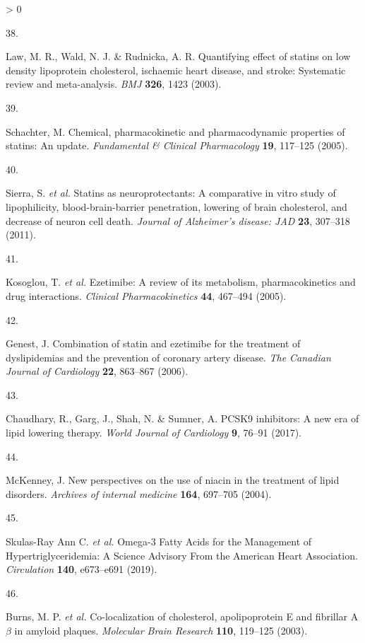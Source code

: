 \documentclass[a4paper, twoside]{templates/ociamthesis}
\newlength{\cslhangindent}
\newlength{\csllabelwidth}
\newenvironment{CSLReferences}[3] %
 {%
  \setlength{\parindent}{0pt}
  \ifodd #1 \everypar{\setlength{\hangindent}{\cslhangindent}}\ignorespaces\fi
  \ifnum #2 > 0
  \setlength{\parskip}{#2\baselineskip}
  \fi
 }%
 {}
\newcommand{\CSLLeftMargin}[1]{\parbox[t]{\maxof{\widthof{#1}}{\csllabelwidth}}{#1}}
\newcommand{\CSLRightInline}[1]{\parbox[t]{\linewidth - \csllabelwidth}{#1}}
\begin{document}
\begin{CSLReferences}{0}{0}
\leavevmode\hypertarget{ref-law2003}{}%
\CSLLeftMargin{38. }
\CSLRightInline{Law, M. R., Wald, N. J. \& Rudnicka, A. R. Quantifying effect of statins on low density lipoprotein cholesterol, ischaemic heart disease, and stroke: Systematic review and meta-analysis. \emph{BMJ} \textbf{326}, 1423 (2003).}

\leavevmode\hypertarget{ref-schachter2005}{}%
\CSLLeftMargin{39. }
\CSLRightInline{Schachter, M. Chemical, pharmacokinetic and pharmacodynamic properties of statins: An update. \emph{Fundamental \& Clinical Pharmacology} \textbf{19}, 117--125 (2005).}

\leavevmode\hypertarget{ref-sierra2011}{}%
\CSLLeftMargin{40. }
\CSLRightInline{Sierra, S. \emph{et al.} Statins as neuroprotectants: A comparative in vitro study of lipophilicity, blood-brain-barrier penetration, lowering of brain cholesterol, and decrease of neuron cell death. \emph{Journal of Alzheimer's disease: JAD} \textbf{23}, 307--318 (2011).}

\leavevmode\hypertarget{ref-kosoglou2005}{}%
\CSLLeftMargin{41. }
\CSLRightInline{Kosoglou, T. \emph{et al.} Ezetimibe: A review of its metabolism, pharmacokinetics and drug interactions. \emph{Clinical Pharmacokinetics} \textbf{44}, 467--494 (2005).}

\leavevmode\hypertarget{ref-genest2006}{}%
\CSLLeftMargin{42. }
\CSLRightInline{Genest, J. Combination of statin and ezetimibe for the treatment of dyslipidemias and the prevention of coronary artery disease. \emph{The Canadian Journal of Cardiology} \textbf{22}, 863--867 (2006).}

\leavevmode\hypertarget{ref-chaudhary2017}{}%
\CSLLeftMargin{43. }
\CSLRightInline{Chaudhary, R., Garg, J., Shah, N. \& Sumner, A. {PCSK9} inhibitors: A new era of lipid lowering therapy. \emph{World Journal of Cardiology} \textbf{9}, 76--91 (2017).}

\leavevmode\hypertarget{ref-mckenney2004}{}%
\CSLLeftMargin{44. }
\CSLRightInline{McKenney, J. New perspectives on the use of niacin in the treatment of lipid disorders. \emph{Archives of internal medicine} \textbf{164}, 697--705 (2004).}

\leavevmode\hypertarget{ref-skulas2019}{}%
\CSLLeftMargin{45. }
\CSLRightInline{Skulas-Ray Ann C. \emph{et al.} Omega-3 {Fatty Acids} for the {Management} of {Hypertriglyceridemia}: A {Science Advisory From} the {American Heart Association}. \emph{Circulation} \textbf{140}, e673--e691 (2019).}

\leavevmode\hypertarget{ref-burns2003}{}%
\CSLLeftMargin{46. }
\CSLRightInline{Burns, M. P. \emph{et al.} Co-localization of cholesterol, apolipoprotein {E} and fibrillar {A\(\beta\)} in amyloid plaques. \emph{Molecular Brain Research} \textbf{110}, 119--125 (2003).}


\end{CSLReferences}
\end{document}
